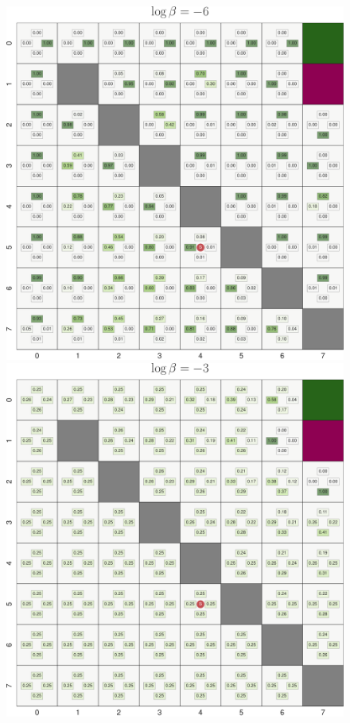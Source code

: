 \begin{figure}[ht]
    \centering
    \begin{minipage}[b]{0.48\linewidth}
        \includegraphics[width=\linewidth]{figs/ch3/gw_beta-6.pdf}
    \end{minipage}
    \hfill
    \begin{minipage}[b]{0.48\linewidth}
        \includegraphics[width=\linewidth]{figs/ch3/gw_beta-3.pdf}

\end{minipage}
\end{figure}

